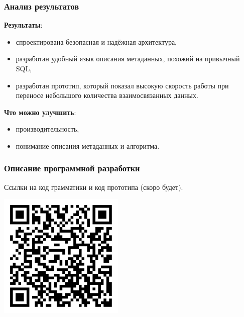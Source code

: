 \documentclass[pdf, hyperref={unicode}, aspectratio=169]{beamer}
\begin{document}
\begin{frame}
\frametitle{Анализ результатов}
	\textbf{Результаты}:

	\begin{itemize}
		\item спроектирована безопасная и надёжная архитектура,
		\item разработан удобный язык описания метаданных, похожий на привычный SQL,
		\item разработан прототип, который показал высокую скорость работы при переносе небольшого количества взаимосвязанных данных.
	\end{itemize}

	\textbf{Что можно улучшить}:

	\begin{itemize}
		\item производительность,
		\item понимание описания метаданных и алгоритма.
	\end{itemize}

\end{frame}


\begin{frame}
\frametitle{Описание программной разработки}
	Ссылки на код грамматики и код прототипа (скоро будет).

	\begin{center}
		\includegraphics[height = 6cm]{img/qr-code-relatio-lang}
	\end{center}
\end{frame}
\end{document}
